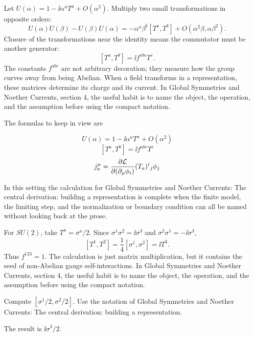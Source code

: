 Let \(U(\alpha)=1-\ii\alpha^aT^a+O(\alpha^2)\).  Multiply two small transformations in opposite orders:
\[
  U(\alpha)U(\beta)-U(\beta)U(\alpha)
  =
  -\alpha^a\beta^b[T^a,T^b]+O(\alpha^2\beta,\alpha\beta^2).
\]
Closure of the transformations near the identity means the commutator must be another generator:
\[
  [T^a,T^b]=\ii f^{abc}T^c.
\]
The constants \(f^{abc}\) are not arbitrary decoration; they measure how the group curves away from being Abelian.  When a field transforms in a representation, these matrices determine its charge and its current.  In Global Symmetries and Noether Currents, section 4, the useful habit is to name the object, the operation, and the assumption before using the compact notation.

The formulas to keep in view are

\[
  U(\alpha)=1-\ii\alpha^aT^a+O(\alpha^2)
\]
\[
  [T^a,T^b]=\ii f^{abc}T^c
\]
\[
  j^\mu_a=\frac{\partial\mathcal L}{\partial(\partial_\mu\phi_i)}(T_a)^i{}_j\phi_j
\]

In this setting the calculation for Global Symmetries and Noether Currents: The central derivation: building a representation is complete when the finite model, the limiting step, and the normalization or boundary condition can all be named without looking back at the prose.




\begin{example}
For \(SU(2)\), take \(T^a=\sigma^a/2\).  Since \(\sigma^1\sigma^2=\ii\sigma^3\) and \(\sigma^2\sigma^1=-\ii\sigma^3\),
\[
  [T^1,T^2]=\frac14[\sigma^1,\sigma^2]=\ii T^3.
\]
Thus \(f^{123}=1\).  The calculation is just matrix multiplication, but it contains the seed of non-Abelian gauge self-interactions.  In Global Symmetries and Noether Currents, section 4, the useful habit is to name the object, the operation, and the assumption before using the compact notation.
\end{example}



\begin{exercise}
Compute \([\sigma^1/2,\sigma^2/2]\).  Use the notation of Global Symmetries and Noether Currents: The central derivation: building a representation.
\begin{answer}
The result is \(\ii\sigma^3/2\).
\end{answer}
\end{exercise}

